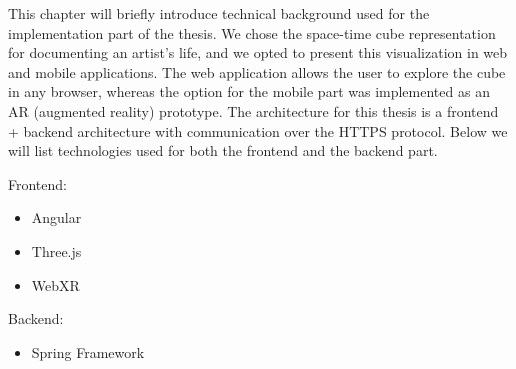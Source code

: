 This chapter will briefly introduce  technical background used for the implementation part of the thesis. We chose the space-time cube
representation for documenting an artist’s life, and we opted to present this visualization in web and mobile applications. The web
application allows the user to explore the cube in any browser, whereas the option for the mobile part was implemented as an AR (augmented
reality) prototype. The architecture for this thesis is a frontend + backend architecture with communication over the HTTPS protocol. Below we
will list technologies used for both the frontend and the backend part.

Frontend:
\begin{itemize}
    \item Angular
    \item Three.js
    \item WebXR
\end{itemize}

Backend:
\begin{itemize}
    \item Spring Framework
\end{itemize}
